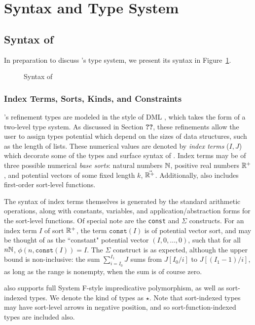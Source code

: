\section{Syntax and Type System \dlambdaamor}
\label{sec:dlambdaamor-syntax-and-types}

\subsection{Syntax of \dlambdaamor}
In preparation to discuss \dlambdaamor's type system, we present its syntax in Figure~\ref{fig:dlambdaamor-syntax}.

\begin{figure}

\caption{Syntax of \dlambdaamor}
\label{fig:dlambdaamor-syntax}
\end{figure}

\subsubsection{Index Terms, Sorts, Kinds, and Constraints}
\dlambdaamor's refinement types are modeled in the style of DML \citehere, which takes the form of a two-level type system. As discussed in Section \textbf{??}, these refinements allow the user to assign types potential which depend on the sizes of data structures, such as the length of lists. These numerical values are denoted by \textit{index terms} ($I,J$) which decorate some of the types and surface syntax of \dlambdaamor. Index terms may be of three possible numerical \textit{base sorts}: natural numbers $\mathbb{N}$, positive real numbers $\mathbb{R}^+$, and potential vectors of some fixed length $k$, $\vec{\mathbb{R}^+}$. Additionally, \dlambdaamor also includes first-order sort-level functions.

The syntax of index terms themselves is generated by the standard arithmetic operations, along with constants, variables, and application/abstraction forms for the sort-level functions. Of special note are the \texttt{const} and $\Sigma$ constructs. For an index term $I$ of sort $\mathbb{R}^+$, the term $\texttt{const}(I)$ is of potential vector sort, and may be thought of as the ``constant" potential vector $(I,0,\dots,0)$, such that for all $n \mathbb{N}$, $\phi(n,\texttt{const}(I)) = I$.
The $\Sigma$ construct is as expected, although the upper bound is non-inclusive: the sum $\sum_{i=I_0}^{I_1} J$ sums from $J[I_0/i]$ to $J[(I_1-1)/i]$, as long as the range is nonempty, when the sum is of course zero.

\dlambdaamor also supports full System F-style impredicative polymorphism, as well as sort-indexed types. We denote the kind of types as $\star$. Note that sort-indexed types may have sort-level arrows in negative position, and so sort-function-indexed types are included also.

